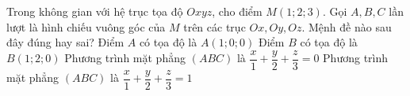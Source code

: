 \begin{ex} %
	Trong không gian với hệ trục tọa độ $Oxyz$, cho điểm $M(1 ; 2 ; 3)$. Gọi $A, B, C$ lần lượt là hình chiếu vuông góc của $M$ trên các trục $Ox, Oy, Oz$. Mệnh đề nào sau đây đúng hay sai?
	\choiceTF
	{\True Điểm $A$ có tọa độ là $A(1 ; 0 ; 0)$}
	{Điểm $B$ có tọa độ là $B(1 ; 2 ; 0)$}
	{Phương trình mặt phẳng $(A B C)$ là $\dfrac{x}{1}+\dfrac{y}{2}+\dfrac{z}{3}=0$}
	{\True Phương trình mặt phẳng $(A B C)$ là $\dfrac{x}{1}+\dfrac{y}{2}+\dfrac{z}{3}=1$}
\end{ex}	

